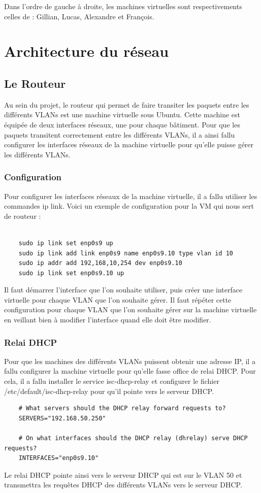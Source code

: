\documentclass[a4paper,12pt,openany]{report}
\begin{document}
            Dans l'ordre de gauche à droite, les machines virtuelles sont respectivements celles de : Gillian, Lucas, Alexandre et François.

    \chapter{Architecture du réseau}
    \section{Le Routeur}
    Au sein du projet, le routeur qui permet de faire transiter les paquets entre les différents VLANs est une machine virtuelle sous Ubuntu. Cette machine est équipée de deux interfaces réseaux, une pour chaque bâtiment. Pour que les paquets transitent correctement entre les différents VLANs, il a ainsi fallu configurer les interfaces réseaux de la machine virtuelle pour qu'elle puisse gérer les différents VLANs.
        \subsection{Configuration}
        Pour configurer les interfaces réseaux de la machine virtuelle, il a fallu utiliser les commandes ip link. Voici un exemple de configuration pour la VM qui nous sert de routeur :
        \begin{verbatim}

    sudo ip link set enp0s9 up
    sudo ip link add link enp0s9 name enp0s9.10 type vlan id 10 
    sudo ip addr add 192,168,10,254 dev enp0s9.10 
    sudo ip link set enp0s9.10 up
        \end{verbatim}
        Il faut démarrer l'interface que l'on souhaite utiliser, puis créer une interface virtuelle pour chaque VLAN que l'on souhaite gérer. Il faut répéter cette configuration pour chaque VLAN que l'on souhaite gérer sur la machine virtuelle en veillant bien à modifier l'interface quand elle doit être modifier. 
        \subsection{Relai DHCP}
        Pour que les machines des différents VLANs puissent obtenir une adresse IP, il a fallu configurer la machine virtuelle pour qu'elle fasse office de relai DHCP. Pour cela, il a fallu installer le service isc-dhcp-relay et configurer le fichier /etc/default/isc-dhcp-relay pour qu'il pointe vers le serveur DHCP.
        \begin{verbatim}
    # What servers should the DHCP relay forward requests to?
    SERVERS="192.168.50.250"

    # On what interfaces should the DHCP relay (dhrelay) serve DHCP requests?
    INTERFACES="enp0s9.10"
        \end{verbatim}
        Le relai DHCP pointe ainsi vers le serveur DHCP qui est sur le VLAN 50 et transmettra les requêtes DHCP des différents VLANs vers le serveur DHCP.
\end{document}
